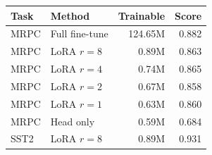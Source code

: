 \begin{tabular}{llrr}
\toprule
Task & Method & Trainable & Score \\
\midrule
MRPC & Full fine-tune & 124.65M & 0.882 \\
MRPC & LoRA $r{=}8$ & 0.89M & 0.863 \\
MRPC & LoRA $r{=}4$ & 0.74M & 0.865 \\
MRPC & LoRA $r{=}2$ & 0.67M & 0.858 \\
MRPC & LoRA $r{=}1$ & 0.63M & 0.860 \\
MRPC & Head only & 0.59M & 0.684 \\
SST2 & LoRA $r{=}8$ & 0.89M & 0.931 \\
\bottomrule
\end{tabular}